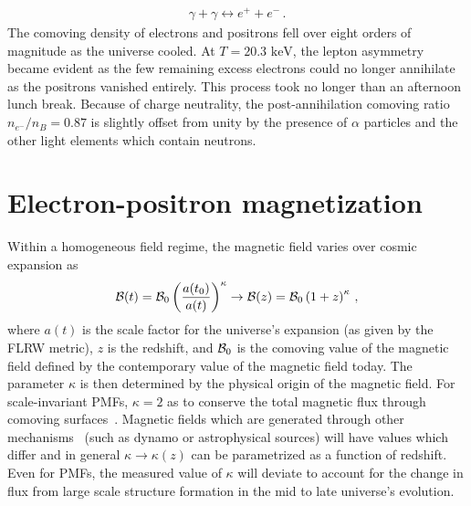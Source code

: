 \documentclass[a4paper]{article}
\newcommand*{\keV}{\text{ keV}}
\begin{document}
\begin{align}
    \label{fusion}
    \gamma+\gamma\leftrightarrow e^{+}+e^{-}\,.
\end{align}
The comoving density of electrons and positrons fell over eight orders of magnitude as the universe cooled. At $T=20.3\keV$, the lepton asymmetry became evident as the few remaining excess electrons could no longer annihilate as the positrons vanished entirely. This process took no longer than an afternoon lunch break. Because of charge neutrality, the post-annihilation comoving ratio $n_{e^{-}}/n_{B}=0.87$ is slightly offset from unity by the presence of $\alpha$ particles and the other light elements which contain neutrons.

\section{Electron-positron magnetization}\label{sec:electronPositron}
\noindent 
Within a homogeneous field regime, the magnetic field varies over cosmic expansion as
\begin{align}
    \label{cosmicscale}
    {\cal B}(t)={\cal B}_{0}\left(\frac{a(t_0)}{a(t)}\right)^{\kappa}\rightarrow{\cal B}(z)={\cal B}_{0}\left(1+z\right)^{\kappa}\,,
\end{align}
where $a(t)$ is the scale factor for the universe's expansion (as given by the FLRW metric), $z$ is the redshift, and ${\cal B}_{0}$ is the comoving value of the magnetic field defined by the contemporary value of the magnetic field today. The parameter $\kappa$ is then determined by the physical origin of the magnetic field. For scale-invariant PMFs, $\kappa=2$ as to conserve the total magnetic flux through comoving surfaces~\cite{durrer2013cosmological}. Magnetic fields which are generated through other mechanisms~\cite{pomakov2022redshift} (such as dynamo or astrophysical sources) will have values which differ and in general $\kappa\rightarrow\kappa(z)$ can be parametrized as a function of redshift. Even for PMFs, the measured value of $\kappa$ will deviate to account for the change in flux from large scale structure formation in the mid to late universe's evolution. 
\end{document}
